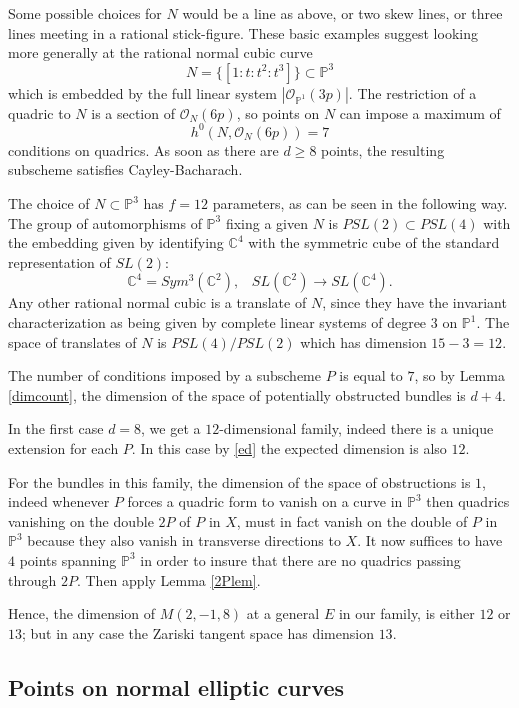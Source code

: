 \documentclass{amsart}
\theoremstyle{plain}
\numberwithin{equation}{section}
\begin{document}
Some possible choices for $N$ would be a line as above, or two skew lines, or
three lines meeting in a rational stick-figure. These basic examples
suggest looking more generally at the rational normal cubic curve
$$
N= \{ [1:t:t^2:t^3]\} \subset {{\mathbb P}} ^3
$$
which is embedded by the full linear system $|{{\mathcal O}} _{{{\mathbb P}} ^1}(3p)|$. 
The restriction of a quadric to $N$ is a section of ${{\mathcal O}} _N(6p)$, so
points on $N$ can impose a maximum of
$$
h^0(N,{{\mathcal O}} _N(6p))= 7
$$
conditions on quadrics. As soon as there are $d\geq 8$ points, the resulting
subscheme satisfies Cayley-Bacharach. 

The choice of $N\subset {{\mathbb P}} ^3$ has $f=12$ parameters, as can be seen in the 
following way. The group of automorphisms of ${{\mathbb P}} ^3$
fixing a given $N$ is $PSL(2)\subset PSL(4)$ with the embedding given by identifying
${{\mathbb C}} ^4$ with
the symmetric cube of the standard representation of $SL(2)$: 
$$
{{\mathbb C}} ^4 = Sym ^3({{\mathbb C}} ^2), \;\;\; SL({{\mathbb C}} ^2)\rightarrow SL({{\mathbb C}} ^4).
$$
Any other rational normal cubic is a translate of $N$, since they have the invariant
characterization as being given by complete linear systems of degree $3$ on ${{\mathbb P}} ^1$.
The space of translates of $N$ is $PSL(4)/PSL(2)$ which has dimension $15-3=12$.

The number of conditions imposed by a subscheme $P$ is equal to $7$, so
by Lemma \ref{dimcount}, the dimension of the space of potentially obstructed bundles is
$d+4$. 

In the first case $d=8$, we get a $12$-dimensional family, indeed there is a unique
extension for each $P$. In this case by \eqref{ed} the expected dimension is
also $12$. 

For the bundles in this family,
the dimension of the space of obstructions is $1$, indeed
whenever $P$ forces a quadric form to vanish on a curve in ${{\mathbb P}} ^3$ then
quadrics vanishing on the double $2P$ of $P$ in $X$, must in fact vanish on the 
double of $P$ in ${{\mathbb P}} ^3$ because they also vanish in transverse directions to $X$.
It now suffices to have $4$ points spanning ${{\mathbb P}} ^3$ in order to insure that
there are no quadrics passing through $2P$. Then apply Lemma \ref{2Plem}.

Hence, the dimension of $M (2,-1,8)$ at a general $E$ in our family, is either 
$12$ or $13$; but in any case the Zariski tangent space has dimension $13$. 

\subsection{Points on normal elliptic curves}
\label{sec-normalelliptic}
\end{document}
